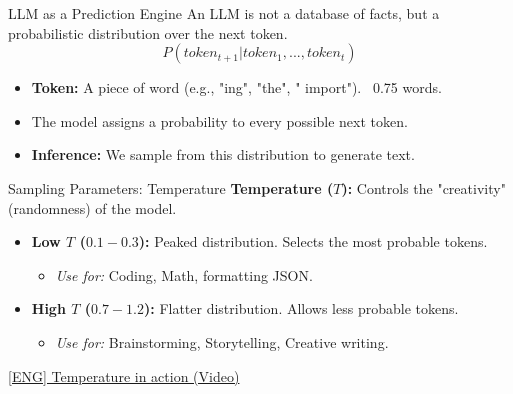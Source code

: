 \documentclass[aspectratio=169]{beamer}
\begin{document}
\begin{frame}[t]{LLM as a Prediction Engine}
    An LLM is not a database of facts, but a probabilistic distribution over the next token.
    $$ P(token_{t+1} | token_1, ..., token_t) $$
    \begin{itemize}
        \item \textbf{Token:} A piece of word (e.g., "ing", "the", " import"). ~0.75 words.
        \item The model assigns a probability to every possible next token.
        \item \textbf{Inference:} We sample from this distribution to generate text.
    \end{itemize}
\end{frame}

\begin{frame}[t]{Sampling Parameters: Temperature}
    \textbf{Temperature ($T$):} Controls the "creativity" (randomness) of the model.
    \begin{itemize}
        \item \textbf{Low $T$ ($0.1 - 0.3$):} Peaked distribution. Selects the most probable tokens.
        \begin{itemize}
            \item \textit{Use for:} Coding, Math, formatting JSON.
        \end{itemize}
        \item \textbf{High $T$ ($0.7 - 1.2$):} Flatter distribution. Allows less probable tokens.
        \begin{itemize}
            \item \textit{Use for:} Brainstorming, Storytelling, Creative writing.
        \end{itemize}
    \end{itemize}
    \href{https://youtube.com/shorts/XsLK3tPy9SI?si=JXLzts8JGzqE6Tr5}{[ENG] Temperature in action (Video)}
\end{frame}
\end{document}
